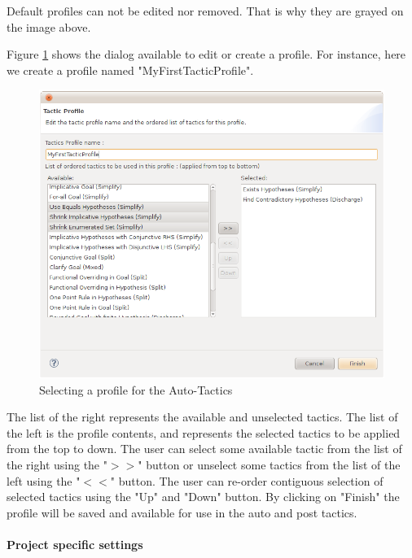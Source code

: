 Default profiles can not be edited nor removed. That is why they are grayed on the image above.

Figure \ref{fig_ref_01_preferences10} shows the dialog available to edit or create a profile. For instance, here we create a profile named "MyFirstTacticProfile".

\begin{figure}[!h]
\begin{center}
	\includegraphics{img/reference/ref_01_preferences10.png}
	\caption{Selecting a profile for the Auto-Tactics}
	\label{fig_ref_01_preferences10}
\end{center}
\end{figure}

The list of the right represents the available and unselected tactics. The list of the left is the profile contents, and represents the selected tactics to be applied from the top to down. The user can select some available tactic from the list of the right using the "$>>$" button or unselect some tactics from the list of the left using the "$<<$" button. The user can re-order contiguous selection of selected tactics using the "Up" and "Down" button. By clicking on "Finish" the profile will be saved and available for use in the auto and post tactics.

\paragraph{Project specific settings}

